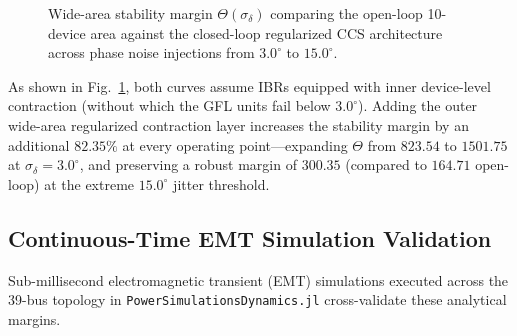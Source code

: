 \documentclass[journal]{IEEEtran}
\begin{document}
\begin{figure}[!t]
\centering
{}
\caption{Wide-area stability margin $\Theta(\sigma_{\delta})$ comparing the open-loop 10-device area against the closed-loop regularized CCS architecture across phase noise injections from $3.0^\circ$ to $15.0^\circ$.}
\label{fig:stability_margin_bars}
\end{figure}

As shown in Fig.~\ref{fig:stability_margin_bars}, both curves assume IBRs equipped with inner device-level contraction (without which the GFL units fail below $3.0^\circ$). Adding the outer wide-area regularized contraction layer increases the stability margin by an additional $82.35\%$ at every operating point—expanding $\Theta$ from $823.54$ to $1501.75$ at $\sigma_{\delta} = 3.0^\circ$, and preserving a robust margin of $300.35$ (compared to $164.71$ open-loop) at the extreme $15.0^\circ$ jitter threshold.

\subsection{Continuous-Time EMT Simulation Validation}
Sub-millisecond electromagnetic transient (EMT) simulations executed across the 39-bus topology in \texttt{PowerSimulationsDynamics.jl} \cite{lara23} cross-validate these analytical margins.
\end{document}
